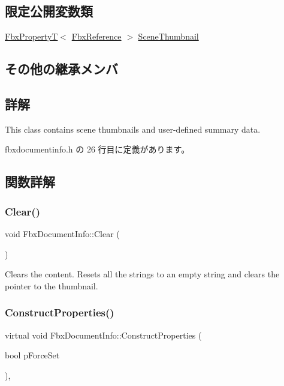 \subsection*{限定公開変数類}
\begin{DoxyCompactItemize}
\item 
\hyperlink{class_fbx_property_t}{Fbx\+PropertyT}$<$ \hyperlink{fbxtypes_8h_a44df6a2eec915cf27cd481e5c5e48a24}{Fbx\+Reference} $>$ \hyperlink{class_fbx_document_info_ab8e6240d40fbc0aa51f72aca4f3b9042}{Scene\+Thumbnail}
\end{DoxyCompactItemize}
\subsection*{その他の継承メンバ}


\subsection{詳解}
This class contains scene thumbnails and user-\/defined summary data. 

 fbxdocumentinfo.\+h の 26 行目に定義があります。



\subsection{関数詳解}
\mbox{\label{class_fbx_document_info_a6a372ab1bf0c0e5452230a42c21f0d23}} 
\subsubsection{\texorpdfstring{Clear()}{Clear()}}
{\footnotesize\ttfamily void Fbx\+Document\+Info\+::\+Clear (\begin{DoxyParamCaption}{ }\end{DoxyParamCaption})}

Clears the content. Resets all the strings to an empty string and clears the pointer to the thumbnail. \mbox{\label{class_fbx_document_info_ae66f4663bce15c6e9c60184764066983}} 
\subsubsection{\texorpdfstring{Construct\+Properties()}{ConstructProperties()}}
{\footnotesize\ttfamily virtual void Fbx\+Document\+Info\+::\+Construct\+Properties (\begin{DoxyParamCaption}\item[{bool}]{p\+Force\+Set }\end{DoxyParamCaption})\hspace{0.3cm}{\ttfamily [protected]}, {\ttfamily [virtual]}}

